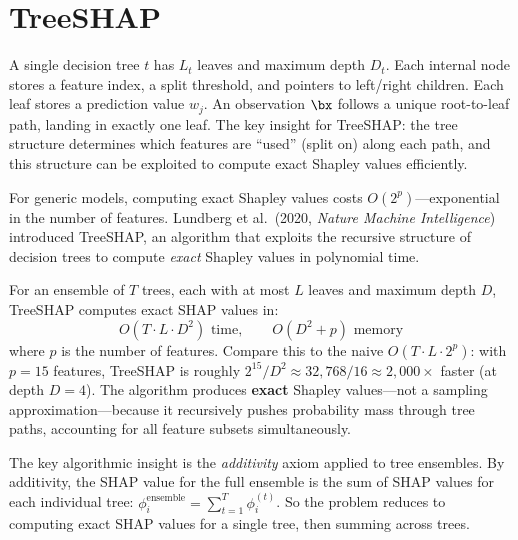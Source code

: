 \section{TreeSHAP}
\label{sec:treeshap}

\begin{prereq}
A single decision tree $t$ has $L_t$ leaves and maximum depth $D_t$.
Each internal node stores a feature index, a split threshold, and pointers to left/right children.
Each leaf stores a prediction value $w_j$.
An observation $\bx$ follows a unique root-to-leaf path, landing in exactly one leaf.
The key insight for TreeSHAP: the tree structure determines which features are ``used'' (split on) along each path, and this structure can be exploited to compute exact Shapley values efficiently.
\end{prereq}

For generic models, computing exact Shapley values costs $O(2^p)$---exponential in the number of features.
Lundberg et al.\ (2020, \textit{Nature Machine Intelligence}) introduced TreeSHAP, an algorithm that exploits the recursive structure of decision trees to compute \emph{exact} Shapley values in polynomial time.

\begin{keyresult}
For an ensemble of $T$ trees, each with at most $L$ leaves and maximum depth $D$, TreeSHAP computes exact SHAP values in:
\begin{equation}
O(T \cdot L \cdot D^2) \text{ time}, \qquad O(D^2 + p) \text{ memory}
\label{eq:treeshap-complexity}
\end{equation}
where $p$ is the number of features.
Compare this to the naive $O(T \cdot L \cdot 2^p)$: with $p = 15$ features, TreeSHAP is roughly $2^{15} / D^2 \approx 32{,}768 / 16 \approx 2{,}000\times$ faster (at depth $D = 4$).
The algorithm produces \textbf{exact} Shapley values---not a sampling approximation---because it recursively pushes probability mass through tree paths, accounting for all feature subsets simultaneously.
\end{keyresult}

The key algorithmic insight is the \emph{additivity} axiom applied to tree ensembles.
By additivity, the SHAP value for the full ensemble is the sum of SHAP values for each individual tree: $\phi_i^{\text{ensemble}} = \sum_{t=1}^T \phi_i^{(t)}$.
So the problem reduces to computing exact SHAP values for a single tree, then summing across trees.

